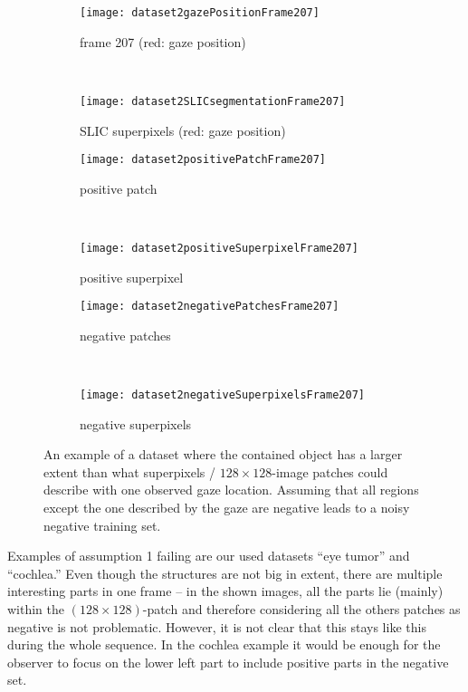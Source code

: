 \begin{figure}[ht]
	\centering
	\begin{subfigure}[h]{0.48\textwidth}
		\texttt{[image: dataset2gazePositionFrame207]}
		\caption*{frame 207 (red: gaze position)}
	\end{subfigure}
	~
	\begin{subfigure}[h]{0.48\textwidth}
	    \texttt{[image: dataset2SLICsegmentationFrame207]}
	    \caption*{SLIC superpixels (red: gaze position)}
	\end{subfigure}
	
	\vspace{3mm}
	\begin{subfigure}[h]{0.31\textwidth}
		\texttt{[image: dataset2positivePatchFrame207]}	
		\caption*{positive patch}
	\end{subfigure}
	~
	\begin{subfigure}[h]{0.31\textwidth}
		\texttt{[image: dataset2positiveSuperpixelFrame207]}	
		\caption*{positive superpixel}
	\end{subfigure}
	
	\vspace{3mm}
		\begin{subfigure}[h]{0.48\textwidth}
		\texttt{[image: dataset2negativePatchesFrame207]}	
		\caption*{negative patches}
	\end{subfigure}
	~
	\begin{subfigure}[h]{0.48\textwidth}
		\texttt{[image: dataset2negativeSuperpixelsFrame207]}	
		\caption*{negative superpixels}
	\end{subfigure}	
	\caption{An example of a dataset where the contained object has a larger extent than what superpixels / $128 \times 128$-image patches could describe with one observed gaze location. Assuming that all regions except the one described by the gaze are negative leads to a noisy negative training set.}
	\label{fig:nonValidAssumptionD2}
\end{figure}

Examples of assumption 1 failing are our used datasets ``eye tumor'' and ``cochlea.'' Even though the structures are not big in extent, there are multiple interesting parts in one frame -- in the shown images, all the parts lie (mainly) within the $(128\times128)$-patch and therefore considering all the others patches as negative is not problematic. 
However, it is not clear that this stays like this during the whole sequence.
In the cochlea example it would be enough for the observer to focus on the lower left part to include positive parts in the negative set. 

